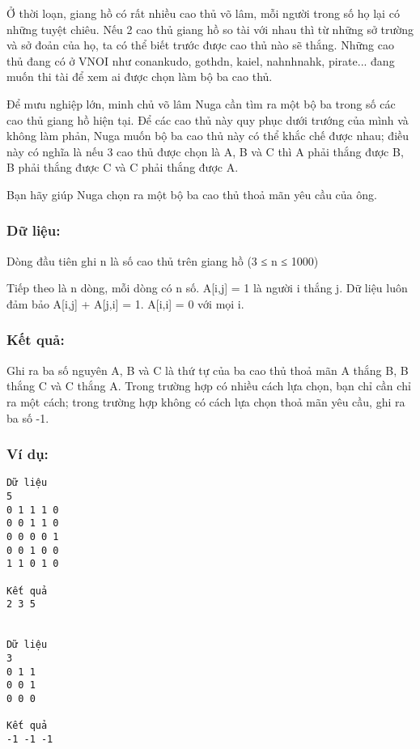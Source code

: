 



   Ở thời loạn, giang hồ có rất nhiều cao thủ võ lâm, mỗi người trong số họ lại có những tuyệt chiêu. Nếu 2 cao thủ giang hồ so tài với nhau thì từ những sở trường và sở đoản của họ, ta có thể biết trước được cao thủ nào sẽ thắng. Những cao thủ đang có ở VNOI như conankudo, gothdn, kaiel, nahnhnahk, pirate... đang muốn thi tài để xem ai được chọn làm bộ ba cao thủ.  

   Để mưu nghiệp lớn, minh chủ võ lâm Nuga cần tìm ra một bộ ba trong số các cao thủ giang hồ hiện tại. Để các cao thủ này quy phục dưới trướng của mình và không làm phản, Nuga muốn bộ ba cao thủ này có thể khắc chế được nhau; điều này có nghĩa là nếu 3 cao thủ được chọn là A, B và C thì A phải thắng được B, B phải thắng được C và C phải thắng được A.  

   Bạn hãy giúp Nuga chọn ra một bộ ba cao thủ thoả mãn yêu cầu của ông.  

\subsubsection{   Dữ liệu:  }

   Dòng đầu tiên ghi n là số cao thủ trên giang hồ (3 ≤ n ≤ 1000)  

   Tiếp theo là n dòng, mỗi dòng có n số. A[i,j] = 1 là người i thắng j. Dữ liệu luôn đảm bảo A[i,j] + A[j,i] = 1. A[i,i] = 0 với mọi i.  

\subsubsection{   Kết quả:  }

   Ghi ra ba số nguyên A, B và C là thứ tự của ba cao thủ thoả mãn A thắng B, B thắng C và C thắng A. Trong trường hợp có nhiều cách lựa chọn, bạn chỉ cần chỉ ra một cách; trong trường hợp không có cách lựa chọn thoả mãn yêu cầu, ghi ra ba số -1.  

\subsubsection{   Ví dụ:  }
\begin{verbatim}
Dữ liệu
5
0 1 1 1 0
0 0 1 1 0
0 0 0 0 1
0 0 1 0 0
1 1 0 1 0

Kết quả
2 3 5


Dữ liệu
3
0 1 1
0 0 1
0 0 0

Kết quả
-1 -1 -1
\end{verbatim}